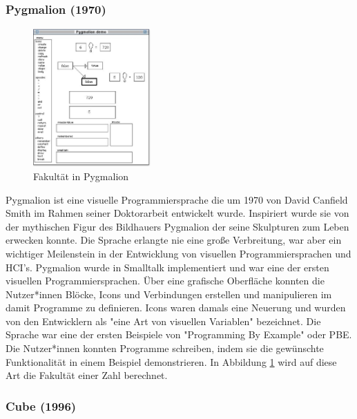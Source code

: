 \documentclass[ngerman]{article}
\begin{document}
\subsubsection{Pygmalion (1970)}
\begingroup
\setlength\intextsep{2pt}
\begin{minipage}{\linewidth}
\begin{figure}
  \centering
  \includegraphics[width=0.4\textwidth]{./graphics/pygmalion.jpg} %
  \caption{Fakultät in Pygmalion \cite{smith1975pygmalion}}
  \label{fig:pygmalion_demo}
\end{figure}

Pygmalion ist eine visuelle Programmiersprache die um 1970 von David Canfield Smith im Rahmen seiner Doktorarbeit entwickelt wurde. Inspiriert wurde sie von der mythischen Figur des Bildhauers Pygmalion der seine Skulpturen zum Leben erwecken konnte.
Die Sprache erlangte nie eine große Verbreitung, war aber ein wichtiger Meilenstein in der Entwicklung von visuellen Programmiersprachen und HCI's.
Pygmalion wurde in Smalltalk implementiert und war eine der ersten visuellen Programmiersprachen. Über eine grafische Oberfläche konnten die Nutzer*innen Blöcke, Icons und Verbindungen erstellen und manipulieren im damit Programme zu definieren.
Icons waren damals eine Neuerung und wurden von den Entwicklern als "eine Art von visuellen Variablen" bezeichnet. 
Die Sprache war eine der ersten Beispiele von "Programming By Example" oder PBE.
Die Nutzer*innen konnten Programme schreiben, indem sie die gewünschte Funktionalität in einem Beispiel demonstrieren. 
In Abbildung \ref{fig:pygmalion_demo} wird auf diese Art die Fakultät einer Zahl berechnet. 

\end{minipage}
\endgroup

\subsubsection{Cube (1996)}
\end{document}
